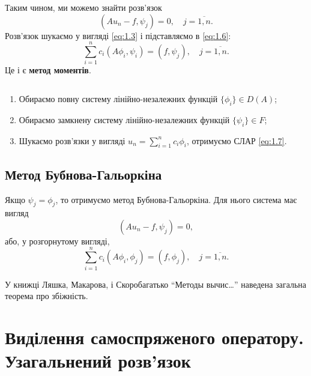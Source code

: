 Таким чином, ми можемо знайти розв'язок 
\begin{equation}
    \label{eq:1.6}
    (A u_n - f, \psi_j) = 0, \quad j = \overline{1,n}.
\end{equation}
Розв'язок шукаємо у вигляді \eqref{eq:1.3} і підставляємо в \eqref{eq:1.6}:
\begin{equation}
    \label{eq:1.7}
    \sum_{i = 1}^n c_i (A \phi_i, \psi_i) = (f, \psi_j), \quad j = \overline{1, n}.
\end{equation}
Це і є \textbf{метод моментів}.

\begin{algorithm} $\left.\right.$
    \label{algorithm:1.7}
    \begin{enumerate}
        \item Обираємо повну систему лінійно-незалежних функцій $\{\phi_i\} \in D(A)$;
        \item Обираємо замкнену систему лінійно-незалежних функцій $\{\psi_i\} \in F$;
        \item Шукаємо розв'язки у вигляді $u_n = \sum_{i = 1}^n c_i \phi_i$, отримуємо СЛАР \eqref{eq:1.7}.
    \end{enumerate}
\end{algorithm}
\subsection{Метод Бубнова-Гальоркіна}
\begin{remark}
    Якщо $\psi_j = \phi_j$, то отримуємо метод Бубнова-Гальоркіна. Для нього система має вигляд 
    \begin{equation*}
        (A u_n - f, \psi_j) = 0,
    \end{equation*}
    або, у розгорнутому вигляді,
    \begin{equation}
        \label{eq:1.8}
        \sum_{i = 1}^n c_i (A \phi_i, \phi_j) = (f, \phi_j), \quad j = \overline{1, n}.
    \end{equation}
\end{remark}

\begin{remark}
    У книжці Ляшка, Макарова, і Скоробагатько ``Методы вычис\ldots'' наведена загальна теорема про збіжність.
\end{remark}

\section{Виділення самоспряженого оператору. \texorpdfstring{\\}{} Узагальнений розв'язок}
